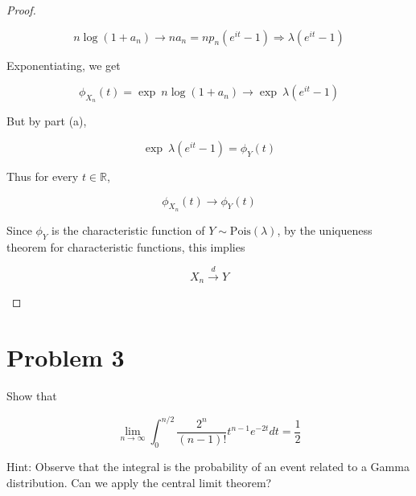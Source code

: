 \documentclass{qlnotes-export}
\begin{document}
\begin{proof}
\begin{itemize}
  \[n\log(1 + a_{n})\rightarrow na_{n} = np_{n}(e^{it} - 1)\Longrightarrow\lambda(e^{it} - 1)\]

  Exponentiating, we get

  \[\phi_{X_{n}}(t) = \exp\ n\log(1 + a_{n})\rightarrow\exp\ \lambda(e^{it} - 1)\]

  But by part (a),

  \[\exp\ \lambda(e^{it} - 1) = \phi_{Y}(t)\]

  Thus for every \(t \in {\mathbb{R}}\),

  \[\phi_{X_{n}}(t)\rightarrow\phi_{Y}(t)\]

  Since \(\phi_{Y}\) is the characteristic function of \(Y \sim \text{Pois}(\lambda)\), by the uniqueness theorem for characteristic functions, this implies

  \[X_{n}\overset{d}{\rightarrow}Y\]
\end{itemize}

\end{proof}

\section{Problem 3}\label{problem-3-6}

Show that

\[\lim\limits_{n\rightarrow\infty}\int_{0}^{n/2}\frac{2^{n}}{(n - 1)!}t^{n - 1}e^{- 2t}dt = \frac{1}{2}\]

Hint: Observe that the integral is the probability of an event related to a Gamma distribution. Can we apply the central limit theorem?
\end{document}
